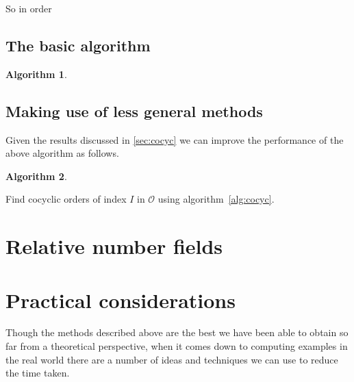 \documentclass[a4paper,abstracton,bibtotoc]{scrreprt}
\theoremstyle{definition}
\newtheorem{alg}{Algorithm}
\begin{document}
So in order 

\subsection{The basic algorithm}
\begin{alg}~\\
\begin{algorithm}[H]
\end{algorithm}
\end{alg}

\subsection{Making use of less general methods} %
Given the results discussed in \ref{sec:cocyc} we can improve the performance of the above algorithm as follows.
\begin{alg}~\\
\begin{algorithm}[H]
Find cocyclic orders of index $I$ in $\mathcal{O}$ using algorithm~\ref{alg:cocyc}.\\
\end{algorithm}
\end{alg}

\section{Relative number fields}


\section{Practical considerations}
Though the methods described above are the best we have been able to obtain so far from a theoretical perspective, when it comes down to computing examples in the real world there are a number of ideas and techniques we can use to reduce the time taken.
\end{document}
